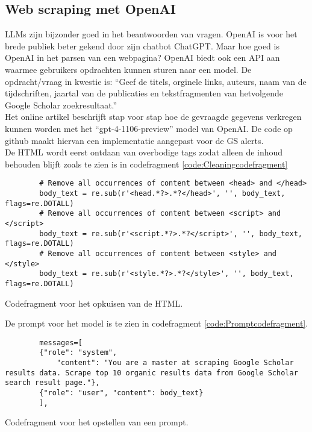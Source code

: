 \subsection{Web scraping met OpenAI}
LLMs zijn bijzonder goed in het beantwoorden van vragen. OpenAI is voor het brede publiek beter gekend door zijn chatbot ChatGPT. Maar hoe goed is OpenAI in het parsen van een webpagina? OpenAI biedt ook een API \autocite{Openaideveloperplatform2025} aan waarmee gebruikers opdrachten kunnen sturen naar een model. De opdracht/vraag in kwestie is: ``Geef de titels, orginele links, auteurs, naam van de tijdschriften, jaartal van de publicaties en tekstfragmenten van hetvolgende Google Scholar zoekresultaat.''\\
Het online artikel \textcite{Serpapiai2025} beschrijft stap voor stap hoe de gevraagde gegevens verkregen kunnen worden met het ``gpt-4-1106-preview'' model van OpenAI.
De code op github \textcite{Depaepeopenai2025} maakt hiervan een implementatie aangepast voor de GS alerts.\\
De HTML wordt eerst ontdaan van overbodige tags zodat alleen de inhoud behouden blijft zoals te zien is in codefragment \ref{code:Cleaningcodefragment}
\begin{listing}
    \begin{verbatim}
        # Remove all occurrences of content between <head> and </head>
        body_text = re.sub(r'<head.*?>.*?</head>', '', body_text, flags=re.DOTALL)
        # Remove all occurrences of content between <script> and </script>
        body_text = re.sub(r'<script.*?>.*?</script>', '', body_text, flags=re.DOTALL)
        # Remove all occurrences of content between <style> and </style>
        body_text = re.sub(r'<style.*?>.*?</style>', '', body_text, flags=re.DOTALL)
    \end{verbatim}
    \caption[Cleaning codefragment]{Codefragment voor het opkuisen van de HTML.}
    \label{code:Cleaningcodefragment}
\end{listing}
De prompt voor het model is te zien in codefragment \ref{code:Promptcodefragment}.
\begin{listing}
    \begin{verbatim}
        messages=[
        {"role": "system",
            "content": "You are a master at scraping Google Scholar results data. Scrape top 10 organic results data from Google Scholar search result page."},
        {"role": "user", "content": body_text}
        ],
    \end{verbatim}
    \caption[Prompt codefragment]{Codefragment voor het opstellen van een prompt.}
    \label{code:Promptcodefragment}
\end{listing}
